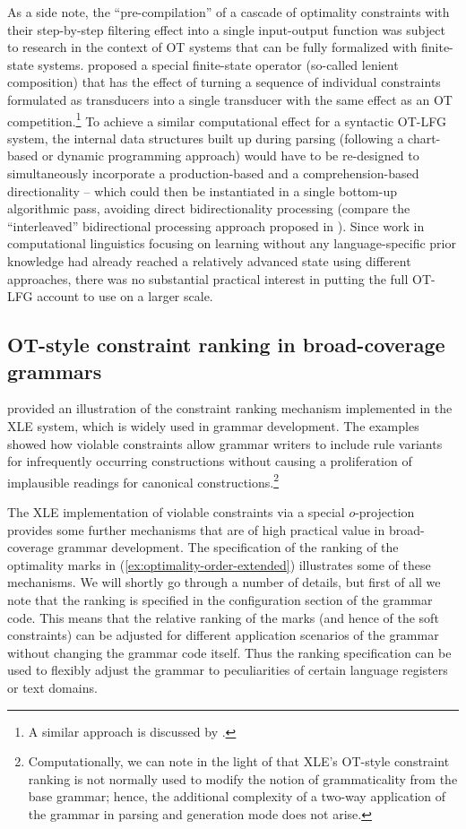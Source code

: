 \documentclass[output=paper,hidelinks]{langscibook}
\begin{document}
As a side note, the ``pre-compilation'' of a cascade of optimality constraints with their step-by-step filtering effect into a single input-output function was subject to research in the context of OT systems that can be fully formalized with finite-state systems. \citet{karttunen-1998-proper} proposed a special finite-state operator (so-called lenient composition) that has the effect of turning a sequence of individual constraints formulated as transducers into a single transducer with the same effect as an OT competition.\footnote{A similar approach is discussed by \citet{FrankSatta98}.} To achieve a similar computational effect for a syntactic OT-LFG system, the internal data structures built up during parsing (following a chart-based or dynamic programming approach) would have to be re-designed to simultaneously incorporate a production-based and a comprehension-based directionality -- which could then be instantiated in a single bottom-up algorithmic pass, avoiding direct bidirectionality processing (compare the ``interleaved'' bidirectional processing approach proposed in \citealt{Kuhn-ACL2000}).
Since work in computational linguistics focusing on learning without any language-specific prior knowledge had already reached a relatively advanced state using different approaches, there was no substantial practical interest in putting the full OT-LFG account to use on a larger scale. 

\subsection{OT-style constraint ranking in broad-coverage grammars} 
\label{sec:OT:OT-style-ranking}

 provided an illustration of the constraint ranking mechanism implemented in the XLE system, which is widely used in grammar development. The examples showed how violable constraints allow grammar writers to include rule variants for infrequently occurring constructions without causing a proliferation of implausible readings for canonical constructions.\footnote{Computationally, we can note in the light of  that XLE's OT-style constraint ranking is not normally used to modify the notion of grammaticality from the base grammar; hence, the additional complexity of a two-way application of the grammar in parsing and generation mode does not arise.}

The XLE implementation of violable constraints via a special $o$-projection provides some further mechanisms that are of high practical value in broad-coverage grammar development.
The specification of the ranking of the optimality marks in (\ref{ex:optimality-order-extended}) illustrates some of these mechanisms. We will shortly go through a number of details, but first of all we note that the ranking is specified in the configuration section of the grammar code. This means that the relative ranking of the marks (and hence of the soft constraints) can be adjusted for different application scenarios of the grammar without changing the grammar code itself. Thus the ranking specification can be used to flexibly adjust the grammar to peculiarities of certain language registers or text domains.
\end{document}
